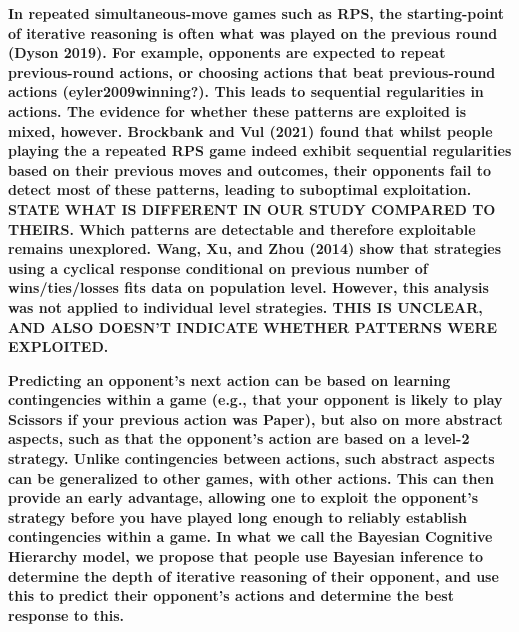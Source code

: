 \documentclass[smallextended]{svjour3}       %
\begin{document}
\textbf{In repeated simultaneous-move games such as RPS, the
starting-point of iterative reasoning is often what was played on the
previous round (Dyson 2019). For example, opponents are expected to
repeat previous-round actions, or choosing actions that beat
previous-round actions (\textbf{eyler2009winning?}). This leads to
sequential regularities in actions. The evidence for whether these
patterns are exploited is mixed, however. Brockbank and Vul (2021) found
that whilst people playing the a repeated RPS game indeed exhibit
sequential regularities based on their previous moves and outcomes,
their opponents fail to detect most of these patterns, leading to
suboptimal exploitation. STATE WHAT IS DIFFERENT IN OUR STUDY COMPARED
TO THEIRS. Which patterns are detectable and therefore exploitable
remains unexplored. Wang, Xu, and Zhou (2014) show that strategies using
a cyclical response conditional on previous number of wins/ties/losses
fits data on population level. However, this analysis was not applied to
individual level strategies. THIS IS UNCLEAR, AND ALSO DOESN'T INDICATE
WHETHER PATTERNS WERE EXPLOITED.}

\textbf{Predicting an opponent's next action can be based on learning
contingencies within a game (e.g., that your opponent is likely to play
Scissors if your previous action was Paper), but also on more abstract
aspects, such as that the opponent's action are based on a level-2
strategy. Unlike contingencies between actions, such abstract aspects
can be generalized to other games, with other actions. This can then
provide an early advantage, allowing one to exploit the opponent's
strategy before you have played long enough to reliably establish
contingencies within a game. In what we call the Bayesian Cognitive
Hierarchy model, we propose that people use Bayesian inference to
determine the depth of iterative reasoning of their opponent, and use
this to predict their opponent's actions and determine the best response
to this.}
\end{document}
